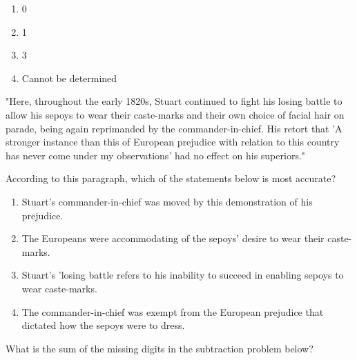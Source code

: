 \begin{enumerate}
    \item 0
    \item 1
    \item 3
    \item Cannot be determined
\end{enumerate}
\item "Here, throughout the early 1820s, Stuart continued to fight his losing battle to allow his sepoys to wear their caste-marks and their own choice of facial hair on parade, being again reprimanded by the commander-in-chief. His retort that 'A stronger instance than this of European prejudice with relation to this country has never come under my observations' had no effect on his superiors."

According to this paragraph, which of the statements below is most accurate?
\begin{enumerate}
    \item Stuart's commander-in-chief was moved by this demonstration of his prejudice.
    \item The Europeans were accommodating of the sepoys' desire to wear their caste-marks. 
    \item Stuart's 'losing battle refers to his inability to succeed in enabling sepoys to wear caste-marks.
    \item The commander-in-chief was exempt from the European prejudice that dictated how the sepoys were to dress.
\end{enumerate}
\item What is the sum of the missing digits in the subtraction problem below?\\
\begin{figure}[!ht]
\centering
{}%

\label{fig:my_label}
\end{figure}
